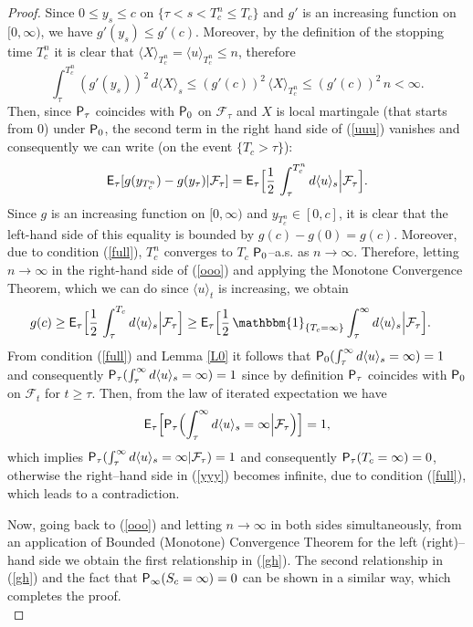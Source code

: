 \documentclass[11pt,reqno]{amsart}
\theoremstyle{remark}
\begin{document}
\begin{proof}
Since  $0 \leq y_{s} \leq c$ on  $\{ \tau  < s < {T_{c}^{n}} \leq {T_{c}} \}$ and $g'$ is an increasing function on $[0,\infty)$, we have $g'(y_{s})\leq g'(c)$. Moreover, by the definition of the stopping time ${T_{c}^{n}}$ it is clear that $\langle X \rangle_{T_{c}^{n}}=\langle  u \rangle_{T_{c}^{n}} \leq n$, therefore   
$$\int_{\tau}^{T_{c}^{n}} (g'(y_{s}))^{2} \, d \langle  X \rangle_{s} \leq (g'(c))^{2} \, \langle  X \rangle_{T_{c}^{n}} \leq (g'(c))^{2} \, n< \infty.$$
Then, since ${{\sf P}}_{\tau}$ coincides with  ${{\sf P}}_{0}$ on ${\mathcal{F}}_{\tau}$ and $X$ is local martingale (that starts from 0) under ${{\sf P}}_{0}$, 
the second term in the right hand side of (\ref{uuu}) vanishes and consequently we can write (on the event $\{{T_{c}} > \tau\}$): 
\begin{align} \label{ooo}
{{\sf E}}_{\tau}[g(y_{T_{c}^{n}})-g(y_{\tau})|{\mathcal{F}}_{\tau}]=  {{\sf E}}_{\tau} \Bigl[ \frac{1}{2} \, \int_{\tau}^{T_{c}^{n}} d\langle u \rangle_{s} \Big| {\mathcal{F}}_{\tau} \Bigr].
\end{align}
Since $g$ is an increasing function on $[0,\infty)$ and $y_{T_{c}^{n}} \in [0,c]$, it is clear  that  the left-hand side of this equality is bounded by $g(c)-g(0)=g(c)$. Moreover, due to condition (\ref{full}), ${T_{c}^{n}}$ converges to ${T_{c}}$ ${{\sf P}}_{0}$--a.s. as $n \rightarrow \infty$. Therefore, letting $n\rightarrow \infty$ in the right-hand side of (\ref{ooo}) and applying the Monotone Convergence Theorem, which we can do since $\langle  u \rangle_{t}$ is increasing, we obtain
\begin{align} \label{yyy}
g(c) &\geq {{\sf E}}_{\tau}\Bigl[  \frac{1}{2} \, \int_{\tau}^{T_{c}} d\langle u \rangle_{s} \Big| {\mathcal{F}}_{\tau}\Bigr] \geq {{\sf E}}_{\tau} \Bigl[ \frac{1}{2} \, {\mathbbm{1}_{\{{{T_{c}} =\infty}\}}}  \int_{\tau}^{\infty} d\langle u \rangle_{s} \Big|{\mathcal{F}}_{\tau} \Bigr]. 
\end{align}
From condition (\ref{full}) and Lemma \ref{L0} it follows that ${{\sf P}}_{0} (\int_{\tau}^{\infty} d\langle u \rangle_{s}=\infty)=1$  and consequently ${{\sf P}}_{\tau}(\int_{\tau}^{\infty} d\langle u \rangle_{s}=\infty)=1$
since by definition ${{\sf P}}_{\tau}$ coincides with ${{\sf P}}_{0}$ on ${\mathcal{F}_{t}}$ for $t\geq \tau$. Then, from the law of iterated expectation we have  
$${{\sf E}}_{\tau} \Bigl[{{\sf P}}_{\tau} \Bigl(\int_{\tau}^{\infty} d\langle u \rangle_{s}=\infty \Big|{\mathcal{F}}_{\tau} \Bigr)\Bigr]=1,$$
which implies ${{\sf P}}_{\tau}(\int_{\tau}^{\infty} d\langle u \rangle_{s}=\infty |{\mathcal{F}}_{\tau})=1$ and consequently ${{\sf P}}_{\tau}({T_{c}} =\infty)=0$, otherwise the right--hand side in (\ref{yyy}) becomes infinite, due to condition (\ref{full}), which leads to a contradiction. 

Now, going back to (\ref{ooo}) and letting $n \rightarrow \infty$ in both sides simultaneously, from an application of Bounded (Monotone) Convergence Theorem for the left (right)--hand side we obtain
the first relationship in (\ref{gh}). The second relationship in (\ref{gh}) and the fact that  ${{\sf P}}_{\infty}({S_{c}} =\infty)=0$ can be shown in a similar way, which completes the proof. \\
\end{proof}
\end{document}
